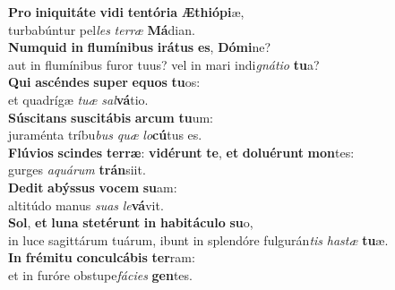 \oddverse \textbf{Pro} \textbf{i}\textbf{ni}\textbf{qui}\textbf{tá}\textbf{te} \textbf{vi}\textbf{di} \textbf{ten}\textbf{tó}\textbf{ri}\textbf{a} \textbf{Æ}\textbf{thi}\textbf{ó}\textbf{pi}æ,~\*\\
\oddverse turbabúntur pel\textit{les} \textit{ter}\textit{ræ} \textbf{Má}dian.\\
\evenverse \textbf{Num}\textbf{quid} \textbf{in} \textbf{flu}\textbf{mí}\textbf{ni}\textbf{bus} \textbf{i}\textbf{rá}\textbf{tus} \textbf{es}, \textbf{Dó}\textbf{mi}ne?~\*\\
\evenverse aut in flumínibus furor tuus? vel in mari indi\textit{gná}\textit{ti}\textit{o} \textbf{tu}a?\\
\oddverse \textbf{Qui} \textbf{a}\textbf{scén}\textbf{des} \textbf{su}\textbf{per} \textbf{e}\textbf{quos} \textbf{tu}os:~\*\\
\oddverse et quadrígæ \textit{tu}\textit{æ} \textit{sal}\textbf{vá}tio.\\
\evenverse \textbf{Sú}\textbf{sci}\textbf{tans} \textbf{su}\textbf{sci}\textbf{tá}\textbf{bis} \textbf{ar}\textbf{cum} \textbf{tu}um:~\*\\
\evenverse juraménta tríbu\textit{bus} \textit{quæ} \textit{lo}\textbf{cú}tus es.\\
\oddverse \textbf{Flú}\textbf{vi}\textbf{os} \textbf{scin}\textbf{des} \textbf{ter}\textbf{ræ}: \textbf{vi}\textbf{dé}\textbf{runt} \textbf{te}, \textbf{et} \textbf{do}\textbf{lu}\textbf{é}\textbf{runt} \textbf{mon}tes:~\*\\
\oddverse gurges \textit{a}\textit{quá}\textit{rum} \textbf{trán}siit.\\
\evenverse \textbf{De}\textbf{dit} \textbf{a}\textbf{býs}\textbf{sus} \textbf{vo}\textbf{cem} \textbf{su}am:~\*\\
\evenverse altitúdo manus \textit{su}\textit{as} \textit{le}\textbf{vá}vit.\\
\oddverse \textbf{Sol}, \textbf{et} \textbf{lu}\textbf{na} \textbf{ste}\textbf{té}\textbf{runt} \textbf{in} \textbf{ha}\textbf{bi}\textbf{tá}\textbf{cu}\textbf{lo} \textbf{su}o,~\*\\
\oddverse in luce sagittárum tuárum, ibunt in splendóre fulgurán\textit{tis} \textit{ha}\textit{stæ} \textbf{tu}æ.\\
\evenverse \textbf{In} \textbf{fré}\textbf{mi}\textbf{tu} \textbf{con}\textbf{cul}\textbf{cá}\textbf{bis} \textbf{ter}ram:~\*\\
\evenverse et in furóre obstupe\textit{fá}\textit{ci}\textit{es} \textbf{gen}tes.\\
